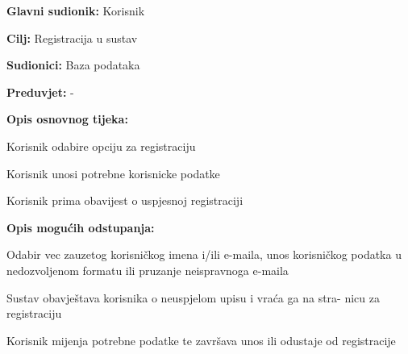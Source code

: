 				\noindent {}
					\begin{packed_item}
	
						\item \textbf{Glavni sudionik: } Korisnik
						\item  \textbf{Cilj:} Registracija u sustav
						\item  \textbf{Sudionici:} Baza podataka
						\item  \textbf{Preduvjet:} -
						\item  \textbf{Opis osnovnog tijeka:}
						
						\item[] \begin{packed_enum}
	
							\item Korisnik odabire opciju za registraciju
							\item Korisnik unosi potrebne korisnicke podatke
							\item Korisnik prima obavijest o uspjesnoj registraciji
						\end{packed_enum}
						
						\item  \textbf{Opis mogućih odstupanja:}
						
						\item[] \begin{packed_item}
	
							\item[2.a] Odabir vec zauzetog korisničkog imena i/ili e-maila, unos korisničkog
							podatka u nedozvoljenom formatu ili pruzanje neispravnoga e-maila
							\item[] \begin{packed_enum}
								
								\item Sustav obavještava korisnika o neuspjelom upisu i vraća ga na stra- 
								nicu za registraciju
								\item Korisnik mijenja potrebne podatke te završava unos ili odustaje od 
								registracije
								
							\end{packed_enum}
							
						\end{packed_item}
					\end{packed_item}

